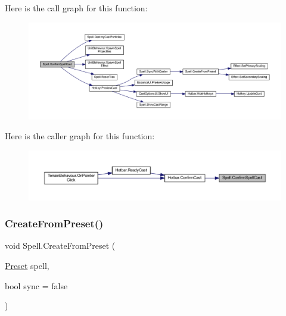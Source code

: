 Here is the call graph for this function\+:\nopagebreak
\begin{figure}[H]
\begin{center}
\leavevmode
\includegraphics[width=350pt]{class_spell_a89146285dc4dadf46398da2683bcc869_cgraph}
\end{center}
\end{figure}
Here is the caller graph for this function\+:\nopagebreak
\begin{figure}[H]
\begin{center}
\leavevmode
\includegraphics[width=350pt]{class_spell_a89146285dc4dadf46398da2683bcc869_icgraph}
\end{center}
\end{figure}
\mbox{\label{class_spell_aee08370358e033af2bf7e0c4c2f2b2bd}} 
\subsubsection{\texorpdfstring{CreateFromPreset()}{CreateFromPreset()}}
{\footnotesize\ttfamily void Spell.\+Create\+From\+Preset (\begin{DoxyParamCaption}\item[{\mbox{\hyperlink{class_spell_a5520e850e7000a6156b3456672b72ed1}{Preset}}}]{spell,  }\item[{bool}]{sync = {\ttfamily false} }\end{DoxyParamCaption})}

